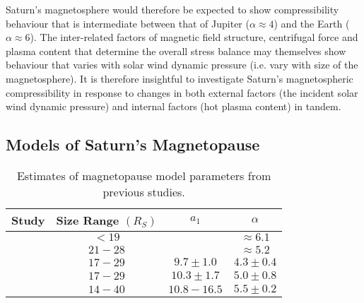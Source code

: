 Saturn's magnetosphere would therefore be expected to show compressibility behaviour that is intermediate between that of Jupiter ($\alpha \approx 4$) and the Earth ($\alpha \approx 6$). The inter-related factors of magnetic field structure, centrifugal force and plasma content that determine the overall stress balance may themselves show behaviour that varies with solar wind dynamic pressure (i.e. vary with size of the magnetosphere). It is therefore insightful to investigate Saturn's magnetospheric compressibility in response to changes in both external factors (the incident solar wind dynamic pressure) and internal factors (hot plasma content) in tandem.

\subsection{Models of Saturn's Magnetopause}\label{compress:sec:prevstudies}
\begin{table}
\caption[Estimates of magnetopause model parameters from previous studies.]{Estimates of magnetopause model parameters from previous studies.}\label{compress:table:prevstudies}
\centering
\begin{tabular}{c c c c}
\hline
Study & Size Range $(\si{R_S})$ & $a_1$ & $\alpha$   \\
\hline
{\citet{slavin1985}} & $< 19$ &  & $\approx 6.1$ \\
{\citet{hansen2005}}   & $21 - 28 $ &  & $\approx 5.2$ \\
{\citet{arridge2006}} & $17-29$ & $9.7 \pm 1.0 $ & $4.3 \pm 0.4$   \\
{\citet{kanani2010}} & $17-29$ & $10.3 \pm 1.7 $ & $5.0 \pm 0.8$ \\
{\citet{pilkington2015}} & $14 - 40$ & $10.8 - 16.5$ & $5.5 \pm 0.2$ \\
\hline
\end{tabular}
\end{table}
